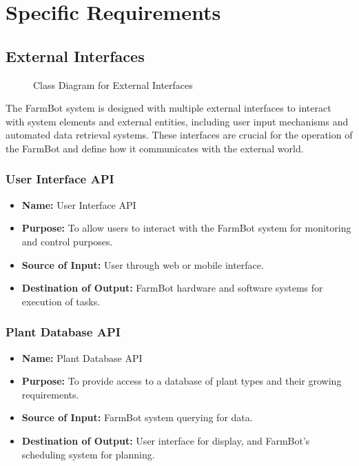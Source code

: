 \chapter{Specific Requirements} \label{specificRequirements}

\section{External Interfaces}
\begin{figure}[H]
    \centering

\caption{Class Diagram for External Interfaces}
\end{figure}

The FarmBot system is designed with multiple external interfaces to interact with system elements and external entities, including user input mechanisms and automated data retrieval systems. These interfaces are crucial for the operation of the FarmBot and define how it communicates with the external world.

\subsection{User Interface API}
\begin{itemize}
    \item \textbf{Name:} User Interface API
    \item \textbf{Purpose:} To allow users to interact with the FarmBot system for monitoring and control purposes.
    \item \textbf{Source of Input:} User through web or mobile interface.
    \item \textbf{Destination of Output:} FarmBot hardware and software systems for execution of tasks.
\end{itemize}

\subsection{Plant Database API}
\begin{itemize}
    \item \textbf{Name:} Plant Database API
    \item \textbf{Purpose:} To provide access to a database of plant types and their growing requirements.
    \item \textbf{Source of Input:} FarmBot system querying for data.
    \item \textbf{Destination of Output:} User interface for display, and FarmBot's scheduling system for planning.
\end{itemize}

